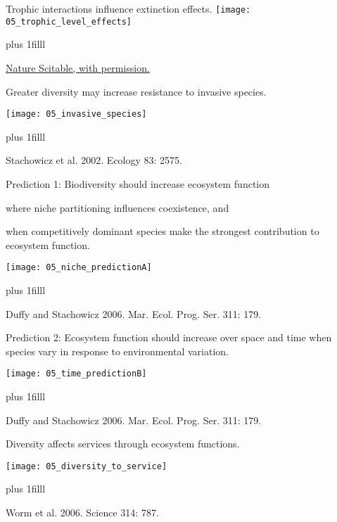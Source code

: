 \documentclass[t]{beamer}
\begin{document}
%
\begin{frame}[t]{Trophic interactions influence extinction effects.}
	\centering
	\texttt{[image: 05\_trophic\_level\_effects]}
	
	\vskip0pt plus 1filll
	
	\hfill\tiny \href{http://www.nature.com/scitable/knowledge/library/biodiversity-and-ecosystem-services-is-it-the-96677163}{\textcopyright Nature Scitable, with permission.}
\end{frame}
%
%
\begin{frame}[t]{Greater diversity may increase resistance to invasive species.}

	\centering\texttt{[image: 05\_invasive\_species]}
	
	\vskip0pt plus 1filll
	
	\hfill \tiny Stachowicz et al. 2002. Ecology 83: 2575.
\end{frame}
%
\begin{frame}[t]{Prediction 1: Biodiversity should increase ecosystem function }
	\begin{multicols}{2}
		where niche partitioning influences coexistence, and
		
		\vspace*{2\baselineskip}
		
		when competitively dominant species make the strongest contribution to ecosystem function.
		
	\columnbreak
		\texttt{[image: 05\_niche\_predictionA]}
		
	\end{multicols}
	\vskip0pt plus 1filll
	
	\hfill\tiny Duffy and Stachowicz 2006. Mar. Ecol. Prog. Ser. 311: 179.
\end{frame}
%
\begin{frame}[t]{Prediction 2: Ecosystem function should increase over space and time when species vary in response to environmental variation.}
	
	\centering	
	
	\texttt{[image: 05\_time\_predictionB]}
	
	\vskip0pt plus 1filll
	
	\hfill\tiny Duffy and Stachowicz 2006. Mar. Ecol. Prog. Ser. 311: 179.

\end{frame}
%
\begin{frame}[t]{Diversity affects services through ecosystem functions.}

		\texttt{[image: 05\_diversity\_to\_service]}
		
	\vskip0pt plus 1filll
	
	\hfill\tiny Worm et al. 2006. Science 314: 787.

\end{frame}
\end{document}
